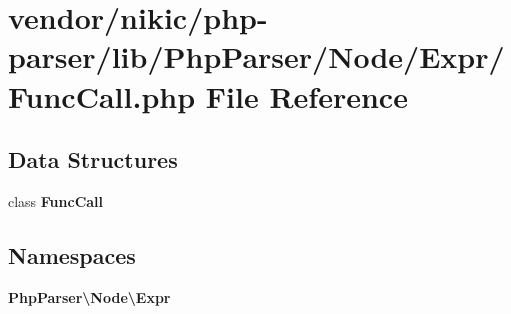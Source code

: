 \section{vendor/nikic/php-\/parser/lib/\+Php\+Parser/\+Node/\+Expr/\+Func\+Call.php File Reference}
\label{_func_call_8php}
\subsection*{Data Structures}
\begin{DoxyCompactItemize}
\item 
class {\bf Func\+Call}
\end{DoxyCompactItemize}
\subsection*{Namespaces}
\begin{DoxyCompactItemize}
\item 
 {\bf Php\+Parser\textbackslash{}\+Node\textbackslash{}\+Expr}
\end{DoxyCompactItemize}
